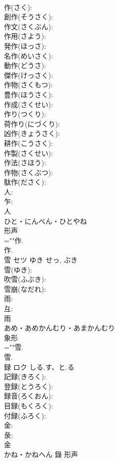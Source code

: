 \documentclass[8pt]{extreport}
\begin{document}
\begin{CJK}{UTF8}{min}
\\	作(さく): 
\\	創作(そうさく): 
\\	作文(さくぶん): 
\\	作用(さよう): 
\\	発作(ほっさ): 
\\	名作(めいさく): 
\\	動作(どうさ): 
\\	傑作(けっさく): 
\\	作物(さくもつ): 
\\	豊作(ほうさく): 
\\	作成(さくせい): 
\\	作り(つくり): 
\\	荷作り(にづくり): 
\\	凶作(きょうさく): 
\\	耕作(こうさく): 
\\	作製(さくせい): 
\\	作法(さほう): 
\\	作物(さくぶつ): 
\\	駄作(ださく): 
\\	人: 
\\	乍: 
\\	人	
\\	ひと・にんべん・ひとやね	
\\	形声 
\\	=""作.
\\	作.
\\	雪	セツ	ゆき	せっ, ぶき	
\\	雪(ゆき): 
\\	吹雪(ふぶき): 
\\	雪崩(なだれ): 
\\	雨: 
\\	彑: 
\\	雨	
\\	あめ・あめかんむり・あまかんむり	
\\	象形 
\\	=""雪.
\\	雪.
\\	録	ロク	しる.す、と.る		
\\	記録(きろく): 
\\	登録(とうろく): 
\\	録音(ろくおん): 
\\	目録(もくろく): 
\\	付録(ふろく): 
\\	金: 
\\	彔: 
\\	金	
\\	かね・かねへん	錄	形声 

\end{CJK}
\end{document}
